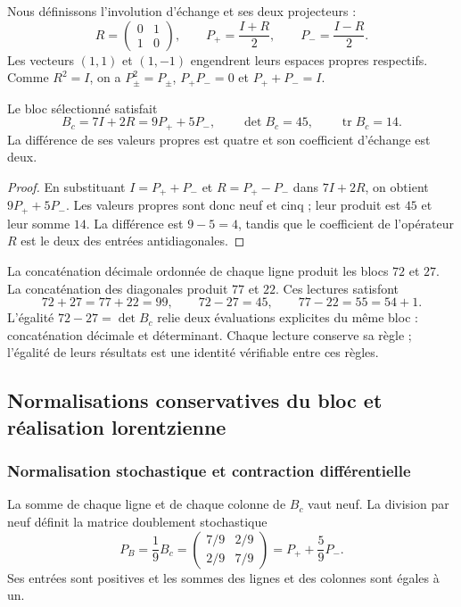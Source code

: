 Nous définissons l'involution d'échange et ses deux projecteurs :
\[
 R=\begin{pmatrix}0&1\\1&0\end{pmatrix},\qquad
 P_+=\frac{I+R}{2},\qquad P_-=\frac{I-R}{2}.
\]
Les vecteurs $(1,1)$ et $(1,-1)$ engendrent leurs espaces propres respectifs. Comme $R^2=I$, on a $P_\pm^2=P_\pm$, $P_+P_-=0$ et $P_++P_-=I$.

\begin{proposicion}
\label{geo:prop-espectro-central}
Le bloc sélectionné satisfait
\[
 B_c=7I+2R=9P_++5P_-,\qquad
 \det B_c=45,\qquad \operatorname{tr}B_c=14.
\]
La différence de ses valeurs propres est quatre et son coefficient d'échange est deux.
\end{proposicion}

\begin{proof}
En substituant $I=P_++P_-$ et $R=P_+-P_-$ dans $7I+2R$, on obtient $9P_++5P_-$. Les valeurs propres sont donc neuf et cinq ; leur produit est $45$ et leur somme $14$. La différence est $9-5=4$, tandis que le coefficient de l'opérateur $R$ est le deux des entrées antidiagonales.
\end{proof}

La concaténation décimale ordonnée de chaque ligne produit les blocs $72$ et $27$. La concaténation des diagonales produit $77$ et $22$. Ces lectures satisfont
\[
 72+27=77+22=99,
 \qquad72-27=45,
 \qquad77-22=55=54+1.
\]
L'égalité $72-27=\det B_c$ relie deux évaluations explicites du même bloc : concaténation décimale et déterminant. Chaque lecture conserve sa règle ; l'égalité de leurs résultats est une identité vérifiable entre ces règles.

\subsection{Normalisations conservatives du bloc et réalisation lorentzienne}
\label{geo:lorentz}

\subsubsection{Normalisation stochastique et contraction différentielle}

La somme de chaque ligne et de chaque colonne de $B_c$ vaut neuf. La division par neuf définit la matrice doublement stochastique
\[
 P_B=\frac19B_c
 =\begin{pmatrix}7/9&2/9\\2/9&7/9\end{pmatrix}
 =P_++\frac59P_-.
\]
Ses entrées sont positives et les sommes des lignes et des colonnes sont égales à un.

